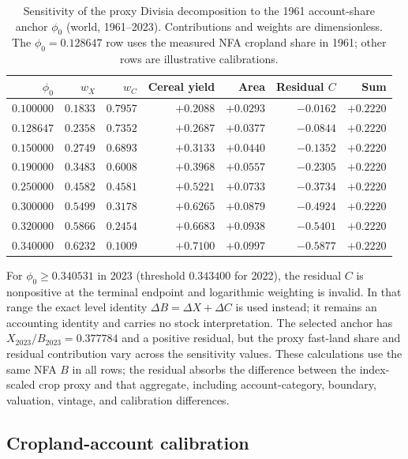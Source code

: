 \documentclass[11pt,a4paper]{article}
\begin{document}
\begin{table}[htbp]
\centering\footnotesize
\caption{Sensitivity of the proxy Divisia decomposition to the 1961 account-share anchor $\phi_0$ (world, 1961--2023). Contributions and weights are dimensionless. The $\phi_0=0.128647$ row uses the measured NFA cropland share in 1961; other rows are illustrative calibrations.}
\label{tab:si_phi0}
\begin{tabular}{r r r r r r r}
\toprule
$\phi_0$ & $w_X$ & $w_C$ & Cereal yield & Area & Residual $C$ & Sum \\
\midrule
$0.100000$ & $0.1833$ & $0.7957$ & $+0.2088$ & $+0.0293$ & $-0.0162$ & $+0.2220$ \\
$0.128647$ & $0.2358$ & $0.7352$ & $+0.2687$ & $+0.0377$ & $-0.0844$ & $+0.2220$ \\
$0.150000$ & $0.2749$ & $0.6893$ & $+0.3133$ & $+0.0440$ & $-0.1352$ & $+0.2220$ \\
$0.190000$ & $0.3483$ & $0.6008$ & $+0.3968$ & $+0.0557$ & $-0.2305$ & $+0.2220$ \\
$0.250000$ & $0.4582$ & $0.4581$ & $+0.5221$ & $+0.0733$ & $-0.3734$ & $+0.2220$ \\
$0.300000$ & $0.5499$ & $0.3178$ & $+0.6265$ & $+0.0879$ & $-0.4924$ & $+0.2220$ \\
$0.320000$ & $0.5866$ & $0.2454$ & $+0.6683$ & $+0.0938$ & $-0.5401$ & $+0.2220$ \\
$0.340000$ & $0.6232$ & $0.1009$ & $+0.7100$ & $+0.0997$ & $-0.5877$ & $+0.2220$ \\
\bottomrule
\end{tabular}
\end{table}

For $\phi_0\ge 0.340531$ in 2023 (threshold $0.343400$ for 2022), the residual $C$ is nonpositive at the terminal endpoint and logarithmic weighting is invalid. In that range the exact level identity $\Delta B=\Delta X+\Delta C$ is used instead; it remains an accounting identity and carries no stock interpretation. The selected anchor has $X_{2023}/B_{2023}=0.377784$ and a positive residual, but the proxy fast-land share and residual contribution vary across the sensitivity values. These calculations use the same NFA $B$ in all rows; the residual absorbs the difference between the index-scaled crop proxy and that aggregate, including account-category, boundary, valuation, vintage, and calibration differences.

\subsection{Cropland-account calibration}\label{si:cropland}
\end{document}
